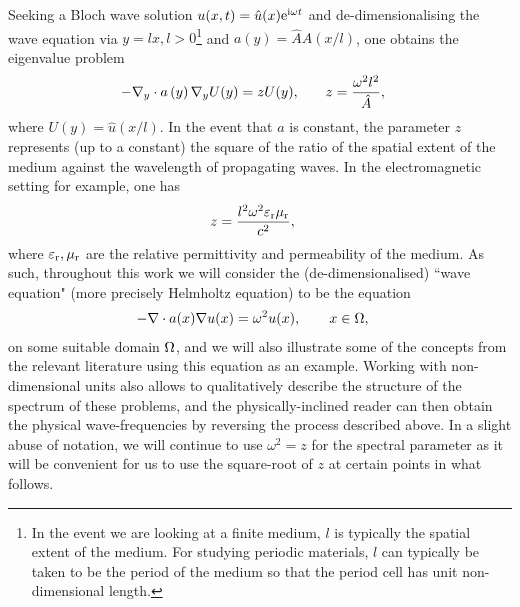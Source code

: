 Seeking a Bloch wave solution $u(x,t) = \hat{u}(x)\mathrm{e}^{\mathrm{i}\omega t}$ and de-dimensionalising the wave equation via $y=lx, l>0$\footnote{In the event we are looking at a finite medium, $l$ is typically the spatial extent of the medium. For studying periodic materials, $l$ can typically be taken to be the period of the medium so that the period cell has unit non-dimensional length.} and $a(y) = \hat{A}A(x/l)$, one obtains the eigenvalue problem
\begin{align*}
	-\nabla_{y}\cdot a\left( y \right)\nabla_{y} U(y) = z U(y),
	&\qquad 
	z = \frac{\omega^2 l^2}{\hat{A}},
\end{align*}
where $U(y)=\hat{u}(x/l)$.
In the event that $a$ is constant, the parameter $z$ represents (up to a constant) the square of the ratio of the spatial extent of the medium against the wavelength of propagating waves.
In the electromagnetic setting for example, one has
\begin{align*}
	z &= \frac{l^2 \omega^2 \varepsilon_\mathrm{r}\mu_{\mathrm{r}}}{c^2},
\end{align*}
where $\varepsilon_\mathrm{r},\mu_{\mathrm{r}}$ are the relative permittivity and permeability of the medium.
As such, throughout this work we will consider the (de-dimensionalised) ``wave equation" (more precisely Helmholtz equation) to be the equation
\begin{align*}
	-\nabla\cdot a(x)\nabla u(x) &= \omega^2 u(x), \qquad x\in\Omega,
\end{align*}
on some suitable domain $\Omega$, and we will also illustrate some of the concepts from the relevant literature using this equation as an example.
Working with non-dimensional units also allows to qualitatively describe the structure of the spectrum of these problems, and the physically-inclined reader can then obtain the physical wave-frequencies by reversing the process described above.
In a slight abuse of notation, we will continue to use $\omega^2 = z$ for the spectral parameter as it will be convenient for us to use the square-root of $z$ at certain points in what follows.

